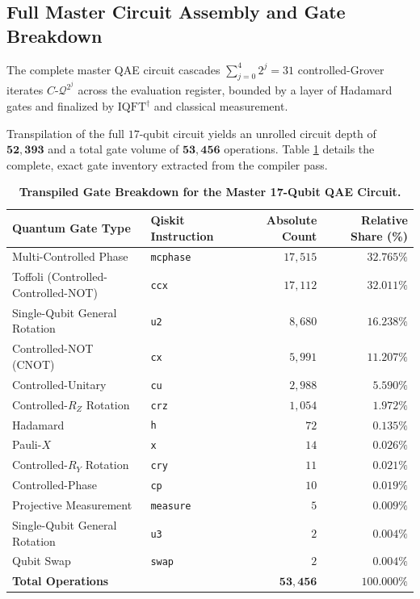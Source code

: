 \subsection{Full Master Circuit Assembly and Gate Breakdown}
The complete master QAE circuit cascades $\sum_{j=0}^{4} 2^j = 31$ controlled-Grover iterates $C\text{-}\mathcal{Q}^{2^j}$ across the evaluation register, bounded by a layer of Hadamard gates and finalized by $\mathrm{IQFT}^\dagger$ and classical measurement.

Transpilation of the full $17$-qubit circuit yields an unrolled circuit depth of $\mathbf{52{,}393}$ and a total gate volume of $\mathbf{53{,}456}$ operations. Table \ref{tab:master_qae_gates} details the complete, exact gate inventory extracted from the compiler pass.

\begin{table}[htbp]
\centering
\caption{\textbf{Transpiled Gate Breakdown for the Master 17-Qubit QAE Circuit.}}
\label{tab:master_qae_gates}
\small
\begin{tabular}{llrr}
\toprule
\textbf{Quantum Gate Type} & \textbf{Qiskit Instruction} & \textbf{Absolute Count} & \textbf{Relative Share (\%)} \\
\midrule
Multi-Controlled Phase & \texttt{mcphase} & $17{,}515$ & $32.765\%$ \\
Toffoli (Controlled-Controlled-NOT) & \texttt{ccx} & $17{,}112$ & $32.011\%$ \\
Single-Qubit General Rotation & \texttt{u2} & $8{,}680$ & $16.238\%$ \\
Controlled-NOT (CNOT) & \texttt{cx} & $5{,}991$ & $11.207\%$ \\
Controlled-Unitary & \texttt{cu} & $2{,}988$ & $5.590\%$ \\
Controlled-$R_Z$ Rotation & \texttt{crz} & $1{,}054$ & $1.972\%$ \\
Hadamard & \texttt{h} & $72$ & $0.135\%$ \\
Pauli-$X$ & \texttt{x} & $14$ & $0.026\%$ \\
Controlled-$R_Y$ Rotation & \texttt{cry} & $11$ & $0.021\%$ \\
Controlled-Phase & \texttt{cp} & $10$ & $0.019\%$ \\
Projective Measurement & \texttt{measure} & $5$ & $0.009\%$ \\
Single-Qubit General Rotation & \texttt{u3} & $2$ & $0.004\%$ \\
Qubit Swap & \texttt{swap} & $2$ & $0.004\%$ \\
\midrule
\textbf{Total Operations} & & $\mathbf{53{,}456}$ & $\mathbf{100.000\%}$ \\
\bottomrule
\end{tabular}
\end{table}

